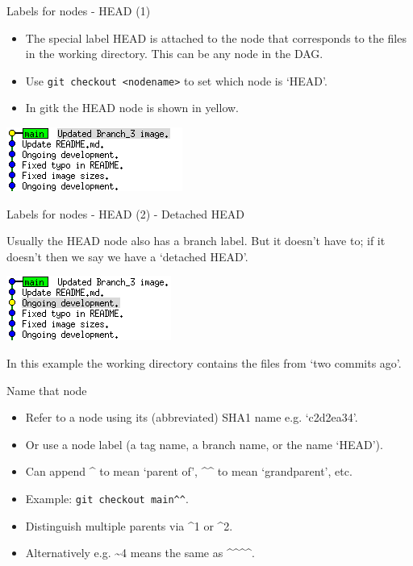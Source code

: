 \documentclass[usenames,dvipsnames]{beamer}
\newcommand{\code}[1]{\colorbox{light-gray}{\texttt{#1}}}
\begin{document}
\begin{frame}{Labels for nodes - HEAD (1)}
  \begin{block}{}
    \begin{itemize}
      \item{The special label HEAD is attached to the node that corresponds to the files in the working directory. This can be any node in the DAG.}
      \item{ Use \code{git checkout <nodename>} to set which node is `HEAD'.}
      \item{In gitk the HEAD node is shown in yellow.}
    \end{itemize}
    \begin{center}
      \includegraphics[scale=0.8]{Head.png}
    \end{center}
  \end{block}
\end{frame}

\begin{frame}{Labels for nodes - HEAD (2) - Detached HEAD}
  \begin{block}{}
     Usually the HEAD node also has a branch label. But it doesn't have to; if it doesn't then we say we have a `detached HEAD'.
    \begin{center}
      \includegraphics[scale=0.8]{DetachedHead.png}
    \end{center}
    In this example the working directory contains the files from `two commits ago'.
  \end{block}
\end{frame}

\begin{frame}{Name that node}
  \begin{block}{}
    \begin{itemize}
      \item{Refer to a node using its (abbreviated) SHA1 name e.g. `c2d2ea34'.}
      \item{Or use a node label (a tag name, a branch name, or the name `HEAD').}
      \item{Can append \^{} to mean `parent of', \^{}\^{} to mean `grandparent', etc.}
      \item{Example: \code{git checkout main\^{}\^{}}.}
      \item{Distinguish multiple parents via \^{}1 or \^{}2.}
      \item{Alternatively e.g. \textasciitilde4 means the same as \^{}\^{}\^{}\^{}.}
    \end{itemize}
  \end{block}
\end{frame}
\end{document}

